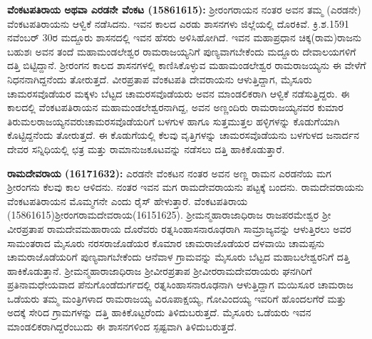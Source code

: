 \textbf{ ವೆಂಕಟಪತಿರಾಯ ಅಥವಾ ಎರಡನೇ ವೆಂಕಟ (15861615): } ಶ‍್ರೀರಂಗರಾಯನ ನಂತರ ಅವನ ತಮ್ಮ (ಎರಡನೇ) ವೆಂಕಟಪತಿರಾಯನು ಆಳ್ವಿಕೆ ನಡೆಸಿದನು. ಇವನ ಕಾಲದ ಎರಡು ಶಾಸನಗಳು ಜಿಲ್ಲೆಯಲ್ಲಿ ದೊರಕಿವೆ. ಕ್ರಿ.ಶ.1591 ನವೆಂಬರ್​ 30ರ ಮದ್ದೂರು ಶಾಸನದಲ್ಲಿ ಇವನ ಹೆಸರು ಅಳಿಸಿಹೋಗಿದೆ. ಇವನ ಮಹಾಪ್ರಧಾನ ಚಿಕ್ಕ(ರಾಮ)ರಾಜನು ಬಹುಶಃ ಅವನ ತಂದೆ ಮಹಾಮಂಡಲೇಶ್ವರ ರಾಮರಾಜಯ್ಯನಿಗೆ ಪುಣ್ಯವಾಗಬೇಕೆಂದು ಮದ್ದೂರು ದೇವಾಲಯಗಳಿಗೆ ದತ್ತಿ ಬಿಟ್ಟಿದ್ದಾನೆ. ಶ‍್ರೀರಂಗನ ಕಾಲದ ಶಾಸನಗಳಲ್ಲಿ ಕಾಣಿಸಿಕೊಳ್ಳುವ ಮಹಾಮಂಡಲೇಶ್ವರ ರಾಮರಾಜಯ್ಯನು ಈ ವೇಳೆಗೆ ನಿಧನನಾಗಿದ್ದನೆಂದು ತೋರುತ್ತದೆ. ವೀರಪ್ರತಾಪ ವೆಂಕಟಪತಿ ದೇವರಾಯನು ಆಳುತ್ತಿದ್ದಾಗ, ಮೈಸೂರು ಚಾಮರಸವೊಡೆಯರ ಮಕ್ಕಳು ಬೆಟ್ಟದ ಚಾಮರಸವೊಡೆಯರು ಅವನ ಮಾಂಡಲಿಕರಾಗಿ ಆಳ್ವಿಕೆ ನಡೆಸುತ್ತಿದ್ದರು. ಈ ಕಾಲದಲ್ಲಿ ವೆಂಕಟಪತಿರಾಯನ ಮಹಾಮಂಡಲೇಶ್ವರನಾಗಿದ್ದ, ಅವನ ಅಣ್ಣಂದಿರು ರಾಮರಾಜಯ್ಯನವರ ಕುಮಾರ ತಿರುಮಲರಾಜಯ್ಯನವರು\break ಚಾಮರಸವೊಡೆಯರಿಗೆ ಬಳಗುಳ ಹಾಗೂ ಸುತ್ತಮುತ್ತಲ ಹಳ್ಳಿಗಳನ್ನು ಕೊಡುಗೆಯಾಗಿ ಕೊಟ್ಟಿದ್ದನೆಂದು ತೋರುತ್ತದೆ. ಈ ಕೊಡುಗೆಯಲ್ಲಿ ಕೆಲವು ವೃತ್ತಿಗಳನ್ನು ಚಾಮರಸವೊಡೆಯನು ಬಳಗುಳದ ಜನಾರ್ದನ ದೇವರ ಸನ್ನಿಧಿಯಲ್ಲಿ ಛತ್ರ ಮತ್ತು ರಾಮಾನುಜಕೂಟವನ್ನು ನಡೆಸಲು ದತ್ತಿ ಹಾಕಿಕೊಡುತ್ತಾರೆ. 

\textbf{ ರಾಮದೇವರಾಯ (16171632): } ಎರಡನೇ ವೆಂಕಟನ ನಂತರ ಅವನ ಅಣ್ಣ ರಾಮನ ಎರಡನೆಯ ಮಗ ಶ‍್ರೀರಂಗನು ಕೆಲವು ಕಾಲ ಆಳಿದನು. ನಂತರ ಇವನ ಮಗ ರಾಮದೇವರಾಯನು ಪಟ್ಟಕ್ಕೆ ಬಂದನು. ರಾಮದೇವರಾಯನು ವೆಂಕಟಪತಿರಾಯನ ಮೊಮ್ಮಗನೇ ಎಂದು ರೈಸ್​ ಹೇಳುತ್ತಾರೆ. ವೆಂಕಟಪತಿರಾಯ (15861615)ಶ‍್ರೀರಂಗರಾಮದೇವರಾಯ\break (16151625). ಶ‍್ರೀಮನ್ಮಹಾರಾಜಾಧಿರಾಜ ರಾಜಪರಮೇಶ್ವರ ಶ‍್ರೀ ವೀರಪ್ರತಾಪ ರಾಮದೇವಮಹಾರಾಯ ದೊರೆವರು ರತ್ನಸಿಂಹಾಸನಾರೂಢರಾಗಿ ಸಾಮ್ರಾಜ್ಯವನ್ನು ಆಳುತ್ತಿರಲು ಅವರ ಸಾಮಂತರಾದ ಮೈಸೂರು ನರಸರಾಜೊಡೆಯರ ಕೊಮಾರ ಚಾಮರಾಜೊಡೆಯರ ದಳವಾಯಿ ಚಾಮಪ್ಪನು ಚಾಮರಾಜೊಡೆಯರಿಗೆ ಪುಣ್ಯವಾಗಬೇಕೆಂದು ಆನೆವಾಳ ಗ್ರಾಮ\-ವನ್ನು ಮೈಸೂರು ಬೆಟ್ಟದ ಮಹಾಬಲೇಶ್ವರನಿಗೆ ದತ್ತಿ ಹಾಕಿಕೊಡುತ್ತಾನೆ. ಶ‍್ರೀಮನ್ಮಹಾರಾಜಾಧಿರಾಜ ಶ‍್ರೀವೀರಪ್ರತಾಪ ಶ‍್ರೀವೀರರಾಮದೇವರಾಯರು ಘನಗಿರಿಗೆ ಪ್ರತಿನಾಮಧೇಯವಾದ ಪೆನುಗೊಂಡೆದುರ್ಗದಲ್ಲಿ ರತ್ನಸಿಂಹಾಸನಾರೂಢನಾಗಿ ಆಳುತ್ತಿದ್ದಾಗ ಮಯಿಸೂರ ಚಾಮರಾಜ ಒಡೆಯರು ತಮ್ಮ ಮಂತ್ರಿಗಳಾದ ರಾಮರಾಜಯ್ಯ ವಿರೂಪಾಕ್ಷಯ್ಯ, ಗೋವಿಂದಯ್ಯ ಇವರಿಗೆ ಹೊಂದಲಗೆರೆ ಮತ್ತು ಅದಕ್ಕೆ ಸೇರಿದ ಗ್ರಾಮಗಳನ್ನು ದತ್ತಿ ಹಾಕಿಕೊಟ್ಟರೆಂದು ತಿಳಿದುಬರುತ್ತದೆ. ಮೈಸೂರು ಒಡೆಯರು ಇವನ ಮಾಂಡಲಿಕರಾಗಿದ್ದರೆಂಬುದು ಈ ಶಾಸನಗಳಿಂದ ಸ್ಪಷ್ಟವಾಗಿ ತಿಳಿದುಬರುತ್ತದೆ. 

